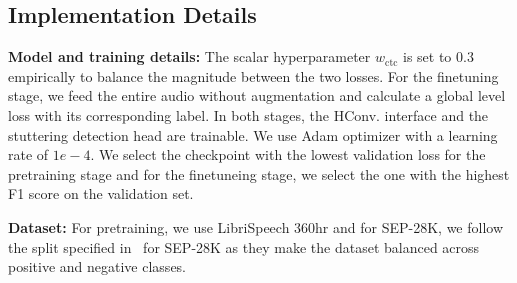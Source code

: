 \subsection{Implementation Details}
\textbf{Model and training details:}
The scalar hyperparameter $w_{\mathrm{ctc}}$ is set to $0.3$ empirically to balance the magnitude between the two losses.
For the finetuning stage, we feed the entire audio without augmentation and calculate a global level loss with its corresponding label.
In both stages, the HConv. interface and the stuttering detection head are trainable.
We use Adam optimizer with a learning rate of $1e-4$.
We select the checkpoint with the lowest validation loss for the pretraining stage and for the finetuneing stage, we select the one with the highest F1 score on the validation set.

\noindent
\textbf{Dataset:}
For pretraining, we use LibriSpeech 360hr and for SEP-28K, we follow the split specified in~\cite{harvill22_interspeech} for SEP-28K as they make the dataset balanced across positive and negative classes.